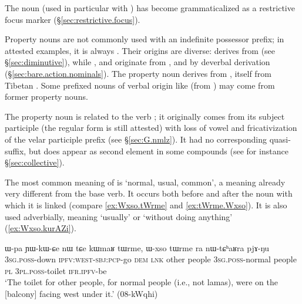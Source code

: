 The noun  (used in particular with ) has become grammaticalized as a restrictive focus marker (§\ref{sec:restrictive.focus}).

Property nouns are not commonly used with an indefinite possessor prefix; in attested examples, it is always . Their origins are diverse:  derives from  (see §\ref{sec:diminutive}), while ,  and  originate from ,  and  by deverbal derivation (§\ref{sec:bare.action.nominals}). The property noun  derives from , itself from Tibetan . Some  prefixed nouns of verbal origin like  (from ) may come from former property nouns.
 
The property noun  is related to the verb ; it originally comes from its subject participle (the regular form  is still attested) with loss of vowel and fricativization of the velar participle prefix (see §\ref{sec:G.nmlz}). It had no corresponding quasi-suffix, but does appear as second element in some compounds (see for instance §\ref{sec:collective}).

The most common meaning of  is `normal, usual, common', a meaning already very different from the base verb. It occurs both before and after the noun with which it is linked (compare \ref{ex:Wxso.tWrme} and \ref{ex:tWrme.Wxso}). It is also used adverbially, meaning `usually' or `without doing anything' (\ref{ex:Wxso.kurAZi}).

\begin{exe}
\ex \label{ex:Wxso.tWrme}
\gll ɯ-pa ɲɯ-kɯ-ɕe nɯ tɕe kɯmaʁ tɯrme, ɯ-xso tɯrme ra nɯ-tɕʰaʁra pjɤ-ŋu \\
\textsc{3sg}.\textsc{poss}-down \textsc{ipfv}:\textsc{west}-\textsc{sbj}:\textsc{pcp}-go \textsc{dem} \textsc{lnk} other people \textsc{3sg}.\textsc{poss}-normal people \textsc{pl} \textsc{3pl}.\textsc{poss}-toilet \textsc{ifr}.\textsc{ipfv}-be \\
\glt `The toilet for other people, for normal people (i.e., not lamas), were on the [balcony] facing west under it.' (08-kWqhi) 
\end{exe} 

